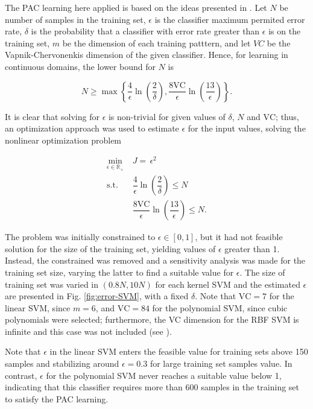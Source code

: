 \documentclass[conference]{IEEEtran}
\theoremstyle{definition}
\theoremstyle{remark}
\theoremstyle{remark}
\begin{document}
The PAC learning here applied is based on the ideas presented in
\parencite{kubat2017}. Let $N$ be number of samples in the training set,
$\epsilon$ is the classifier maximum permited error rate, $\delta$ is the
probability that a classifier with error rate greater than $\epsilon$ is
 on the training set, $m$ be the dimension of each training
patttern, and let $VC$ be the Vapnik-Chervonenkis dimension of the given
classifier. Hence, for learning in continuous domains, the lower bound for
$N$ is

\begin{equation}
N\geq \max\left\{ \dfrac{4}{\epsilon}\ln\left(\dfrac{2}{\delta}\right),
\dfrac{8\mathrm{VC}}{\epsilon}\ln\left(\dfrac{13}{\epsilon}\right) \right\}.
\end{equation}

It is clear that solving for $\epsilon$ is non-trivial for given values of
$\delta$, $N$ and $\mathrm{VC}$; thus, an optimization approach was used to
estimate $\epsilon$ for the input values, solving the nonlinear optimization
problem

\begin{equation}
\begin{split}
\min_{\epsilon\in\mathbb{R}_+}\ &J=\,\epsilon^2\\
\mathrm{s.t.}\ &\dfrac{4}{\epsilon}\ln\left(\dfrac{2}{\delta} \right)\leq N\\
\quad&\dfrac{8\mathrm{VC}}{\epsilon}\ln\left(\dfrac{13}{\epsilon}\right)\leq N.
\end{split}
\end{equation}

The problem was initially constrained to $\epsilon\in[0,1]$, but it had not
feasible solution for the size of the training set, yielding values of
$\epsilon$ greater than 1. Instead, the constrained was removed and a
sensitivity analysis was made for the training set size, varying the latter to
find a suitable value for $\epsilon$. The size of training set was varied in
$(0.8N, 10N)$ for each kernel SVM and the estimated $\epsilon$ are presented
in Fig. \ref{fig:error-SVM}, with a fixed $\delta$. Note that $\mathrm{VC}=7$
for the linear SVM, since
$m=6$, and $\mathrm{VC}=84$ for the polynomial SVM, since cubic polynomials were
selected; furthermore, the VC dimension for the RBF SVM is infinite and this
case was not included (see \parencite{burges1998}).

Note that $\epsilon$ in the linear SVM enters the feasible value for training
sets above 150 samples and stabilizing around $\epsilon=0.3$ for large training
set samples value. In contrast, $\epsilon$ for the polynomial SVM never reaches
a suitable value below 1, indicating that this classifier requires more than 600
samples in the training set to satisfy the PAC learning.
\end{document}
